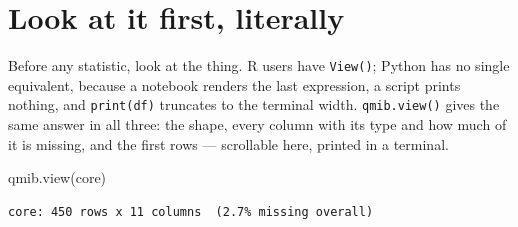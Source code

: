 \documentclass[
  letterpaper,
  10pt,
  twoside,
  openright,
  numbers=noenddot,
  chapterprefix=true]{scrbook}
\newenvironment{Shaded}{}{}
\newcommand{\NormalTok}[1]{\textcolor[rgb]{0.14,0.16,0.18}{#1}}
\begin{document}
\section{Look at it first, literally}\label{look-at-it-first-literally}

Before any statistic, look at the thing. R users have \texttt{View()};
Python has no single equivalent, because a notebook renders the last
expression, a script prints nothing, and \texttt{print(df)} truncates to
the terminal width. \texttt{qmib.view()} gives the same answer in all
three: the shape, every column with its type and how much of it is
missing, and the first rows --- scrollable here, printed in a terminal.

\label{view-core}
\begin{Shaded}
\begin{Highlighting}[]
\NormalTok{qmib.view(core)}
\end{Highlighting}
\end{Shaded}

\begin{verbatim}
core: 450 rows x 11 columns  (2.7% missing overall)
\end{verbatim}
\end{document}
